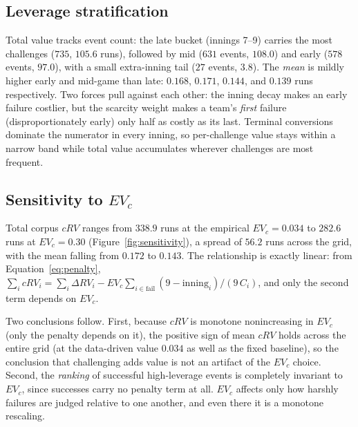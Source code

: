 \subsection{Leverage stratification}


Total value tracks event count: the late bucket (innings 7--9) carries the most
challenges ($735$, $105.6$ runs), followed by mid ($631$ events, $108.0$) and
early ($578$ events, $97.0$), with a small extra-inning tail ($27$ events,
$3.8$). The \emph{mean} is mildly higher early and mid-game than late: $0.168$,
$0.171$, $0.144$, and $0.139$ runs respectively. Two forces pull against each
other: the inning decay makes an early failure costlier, but the scarcity
weight makes a team's \emph{first} failure (disproportionately early) only
half as costly as its last. Terminal conversions dominate the numerator in
every inning, so per-challenge value stays within a narrow band while total
value accumulates wherever challenges are most frequent.

\subsection{Sensitivity to $EV_c$}
\label{sec:sensitivity}



Total corpus $cRV$ ranges from $338.9$ runs at the empirical $EV_c = 0.034$ to
$282.6$ runs at $EV_c = 0.30$ (Figure~\ref{fig:sensitivity}), a spread of
$56.2$ runs across the grid, with the mean falling from $0.172$ to $0.143$.
The relationship is exactly linear: from Equation~\ref{eq:penalty},
$\sum_i cRV_i = \sum_i \Delta RV_i - EV_c \sum_{i \in \text{fail}}
(9 - \mathrm{inning}_i)/(9\,C_i)$, and only the second term depends on $EV_c$.

Two conclusions follow. First, because $cRV$ is monotone nonincreasing in
$EV_c$ (only the penalty depends on it), the positive sign of mean $cRV$ holds
across the entire grid (at the data-driven value $0.034$ as well as the fixed
baseline), so the conclusion that challenging adds value is not an artifact of
the $EV_c$ choice. Second, the \emph{ranking} of successful
high-leverage events is completely invariant to $EV_c$, since successes carry
no penalty term at all. $EV_c$ affects only how harshly failures are judged
relative to one another, and even there it is a monotone rescaling.

